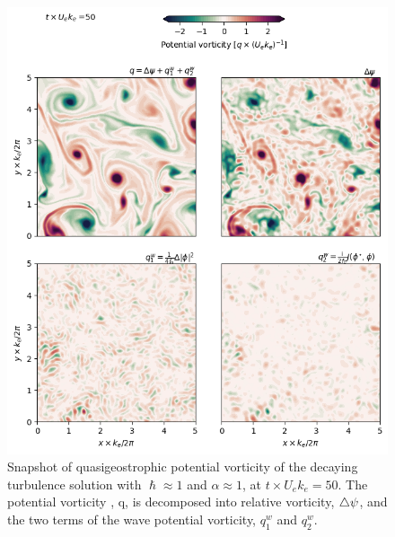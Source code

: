 \documentclass{jfm}
\begin{document}
 \begin{figure}
 \label{pv-terms_turb}
 \centering
 \includegraphics[width=.9\textwidth]{figs/fig5.png}
 \caption{Snapshot of quasigeostrophic potential vorticity
          of the decaying turbulence solution with $\hslash \approx 1$
          and $\alpha \approx 1$, at $t\times U_e k_e = 50$. The potential vorticity
          , q, is decomposed into relative vorticity, $\triangle\psi$,
          and the two terms of the wave potential vorticity, $q^w_1$ and $q^w_2$.
         }
 \end{figure}


 
\end{document}
